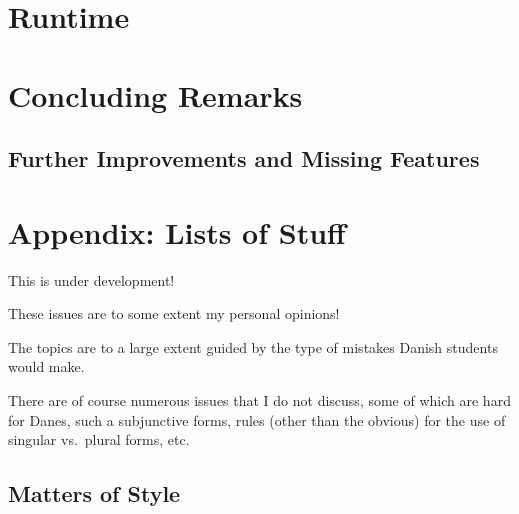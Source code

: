 \documentclass[a4paper,12pt]{report}
\begin{document}
\chapter{Runtime}

\chapter{Concluding Remarks}
\section*{Further Improvements and Missing Features}





\appendix

\newpage

\chapter*{Appendix: Lists of Stuff}
\label{appendix}

This is under development!

These issues are to some extent my personal opinions!

The topics are to a large extent guided by the type of mistakes Danish
students would make.

There are of course numerous issues that I do not discuss, some of
which are hard for Danes, such a subjunctive forms, rules (other
than the obvious) for the use of singular vs.\ plural forms, etc.

\section*{Matters of Style}
\end{document}
